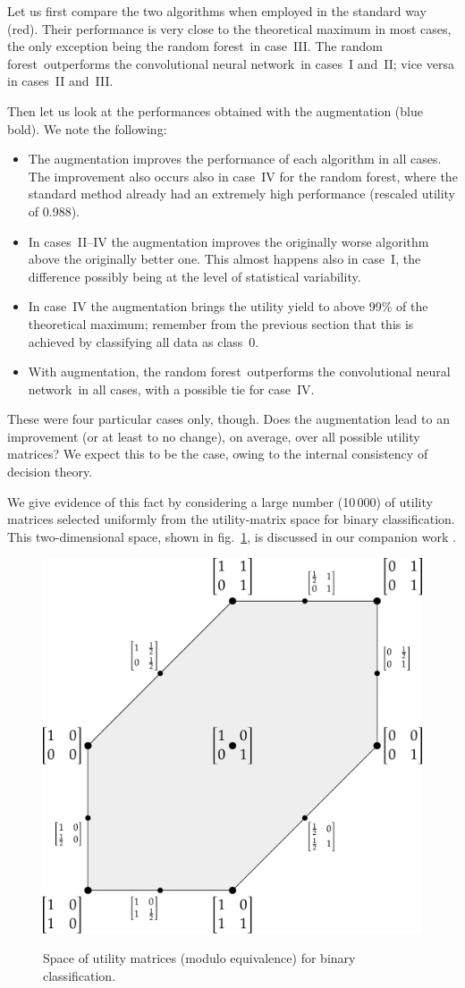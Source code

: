 \documentclass[\ifafour a4paper,12pt,\else a5paper,10pt,\fi%
onecolumn,oneside,article,%
british%
]{memoir}
\theoremstyle{remark}
\theoremstyle{innote}
\renewcommand*{\|}[1][]{\nonscript\:#1\vert\nonscript\:\mathopen{}}
\newcommand*{\sect}{\S}%
\newcommand*{\fig}{fig.}%
\newcommand*{\RF}{random forest}
\newcommand*{\CNN}{convolutional neural network}
\begin{document}
\medskip

Let us first compare the two algorithms when employed in the standard way (red). Their performance is very close to the theoretical maximum in most cases, the only exception being the \RF\ in case~III.  The \RF\ outperforms the \CNN\ in  cases~I and~II; vice versa in cases~II and~III.

Then let us look at the performances obtained with the augmentation (blue bold). We note the following:
\begin{itemize}
\item The augmentation improves the performance of each algorithm in all cases. The improvement also occurs also in case~IV for the \RF, where the standard method already had an extremely high performance (rescaled utility of 0.988).
\item In cases~II--IV the augmentation improves the originally worse algorithm above the originally better one. This almost happens also in case~I, the difference possibly being at the level of statistical variability.
\item In case~IV the augmentation brings the utility yield to above 99\% of the theoretical maximum; remember from the previous section that this is achieved by classifying all data as class~0.
\item With augmentation, the \RF\ outperforms the \CNN\ in all cases, with a possible tie for case~IV.
\end{itemize}




\medskip

These were four particular cases only, though. Does the augmentation lead to an improvement (or at least to no change), on average, over all possible utility matrices? We expect this to be the case, owing to the internal consistency of decision theory.

We give evidence of this fact by considering a large number (10\,000) of utility matrices selected uniformly from the utility-matrix space for binary classification. This two-dimensional space, shown in \fig~\ref{fig:space_UM}, is discussed in our companion work \autocites[\sect~3.2]{dyrlandetal2022}.
\begin{figure}[t]
  \centering
  \includegraphics[width=0.5\linewidth]{space_UM2c.pdf}\\
  \caption{Space of utility matrices (modulo equivalence) for binary classification.}
  \label{fig:space_UM}
\end{figure}
\end{document}
